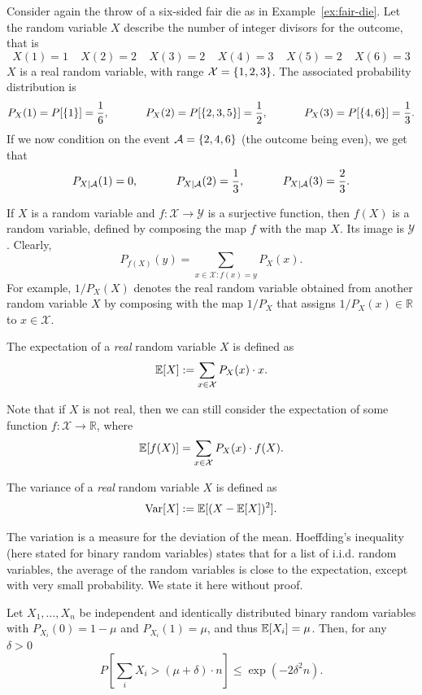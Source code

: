 \begin{example}
Consider again the throw of a six-sided fair die as in Example~\ref{ex:fair-die}. Let the random variable $X$ describe the number of integer divisors for the outcome, that is
\[X(1) = 1 \ \ \ \ \ X(2) = 2 \ \ \ \ \ X(3) = 2 \ \ \ \ \ X(4) = 3 \ \ \ \ \ X(5) = 2 \ \ \ \ \ X(6) = 3
\]
$X$ is a real random variable, with range $\mathcal{X} = \{1,2,3\}$. The associated probability distribution is
\[P_X(1) = P[\{1\}] = \frac{1}{6}, \ \ \ \ \ \ \ \ \ \ P_X(2) = P[\{2,3,5\}] = \frac{1}{2}, \ \ \ \ \ \ \ \ \ \ P_X(3) = P[\{4,6\}] = \frac{1}{3}.
\]
If we now condition on the event $\mathcal{A} = \{2,4,6\}$ (the outcome being even), we get that
\[P_{X | \evA}(1) = 0, \ \ \ \ \ \ \ \ \ \ P_{X | \evA}(2) = \frac{1}{3}, \ \ \ \ \ \ \ \ \ \ P_{X | \evA}(3) = \frac{2}{3}.
\]
\end{example}
If $X$ is a random variable and $f : \mathcal{X} \to \mathcal{Y}$ is a surjective function, then $f(X)$ is a random variable, defined by composing the map $f$ with the map $X$. Its image is $\mathcal{Y}$. Clearly,
\[
P_{f(X)}(y) = \sum_{x \in \mathcal{X} : f(x) = y} P_X(x).
\]
For example, $1/P_X(X)$ denotes the real random variable obtained from another random variable $X$ by composing with the map $1/P_X$ that assigns $1/P_X(x) \in \mathbb{R}$ to $x \in \mathcal{X}$.

\begin{definition}[Expectation]
The expectation of a \emph{real} random variable $X$ is defined as
\[
\mathbb{E}[X] := \sum_{x \in \mathcal{X}} P_X(x) \cdot x.
\]
\end{definition}
Note that if $X$ is not real, then we can still consider the expectation of some function $f : \mathcal{X} \to \mathbb{R}$, where
\[
\mathbb{E}[f(X)] = \sum_{x \in \mathcal{X}} P_X(x) \cdot f(X).
\]
\begin{definition}[Variance]
The variance of a \emph{real} random variable $X$ is defined as
\[
\mathrm{Var}[X] := \mathbb{E}[(X - \mathbb{E}[X])^2].
\]
\end{definition}
The variation is a measure for the deviation of the mean. Hoeffding's inequality (here stated for binary random variables) states that for a list of i.i.d. random variables, the average of the random variables is close to the expectation, except with very small probability. We state it here without proof.

\begin{theorem}
Let $X_1, ..., X_n$ be independent and identically distributed binary random variables with $P_{X_i}(0) = 1 - \mu$ and $P_{X_i}(1) = \mu$, and thus $\mathbb{E}[X_i] = \mu$. Then, for any $\delta > 0$
\[
P\left[\sum_i X_i > (\mu + \delta) \cdot n\right] \leq \exp(-2\delta^2n).
\]
\end{theorem}

